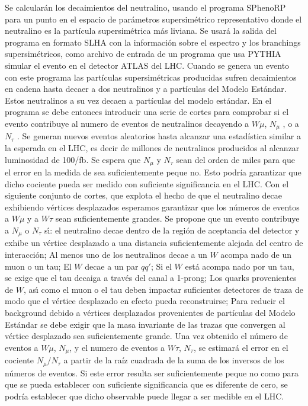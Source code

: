 \begin{ideas}
Se calcularán los decaimientos del neutralino, usando el programa
SPhenoRP para un punto en el espacio de parámetros supersimétrico
representativo %
donde el neutralino es
la partícula supersimétrica más liviana. Se usará la salida del
programa en formato SLHA %
con la información
sobre el espectro y los branchings supersimétricos, como archivo de
entrada de un programa que usa PYTHIA %
simular el evento en el detector ATLAS del LHC. Cuando se genera un
evento con este programa las partículas supersimétricas producidas
sufren decaimientos en cadena hasta decaer a dos neutralinos y a
partículas del Modelo Estándar. Estos neutralinos a su vez decaen a
partículas del modelo estándar. En el programa se debe entonces
introducir una serie de cortes para comprobar si el evento contribuye
al numero de eventos de neutralinos decayendo a $W\mu$, $N_\mu$ , o a
$N_\tau$ . Se generan nuevos eventos aleatorios hasta alcanzar una
estadística similar a la esperada en el LHC, es decir de millones de
neutralinos producidos al alcanzar luminosidad de 100/fb. Se espera
que $N_\mu$ y $N_\tau$ sean del orden de miles para que el error en la
medida de sea suficientemente peque no. Esto podría garantizar que
dicho cociente pueda ser medido con suficiente significancia en el
LHC. Con el siguiente conjunto de cortes, que explota el hecho de que
el neutralino decae exhibiendo vértices desplazados
esperamos garantizar que los números de eventos
a $W\mu$ y a $W\tau$ sean suficientemente grandes. Se propone que un evento
contribuye a $N_\mu$ o $N_\tau$ s\'\i: el neutralino decae dentro de la región
de aceptancia del detector y exhibe un vértice desplazado a una
distancia suficientemente alejada del centro de interacción; Al menos
uno de los neutralinos decae a un $W$ acompa nado de un muon o un tau;
El $W$ decae a un par $qq'$; Si el $W$ está acompa nado por un tau, se
exige que el tau decaiga a través del canal a 1-prong; Los quarks
provenientes de $W$, as\'\i{} como el muon o el tau deben impactar
suficientes detectores de traza de modo que el vértice desplazado en
efecto pueda reconstruirse; Para reducir el background debido a
vértices desplazados provenientes de partículas del Modelo Estándar se
debe exigir que la masa invariante de las trazas que convergen al
vértice desplazado sea suficientemente grande.  Una vez obtenido el
número de eventos a $W \mu$, $N_\mu$, y el numero de eventos a $W \tau$, $N_\tau$, se
estimará el error en el cociente $N_\mu / N_\tau$ a partir de la raíz
cuadrada de la suma de los inversos de los números de eventos. Si este
error resulta ser suficientemente peque no como para que se pueda
establecer con suficiente significancia que es diferente de cero, se
podría establecer que dicho observable puede llegar a ser medible en
el LHC.


\end{ideas}
